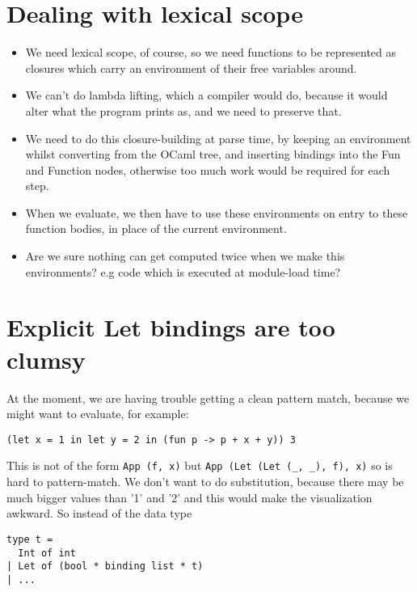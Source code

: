 \documentclass[10pt]{article}
\begin{document}
\section*{Dealing with lexical scope}

\begin{itemize}
\item We need lexical scope, of course, so we need functions to be represented as
closures which carry an environment of their free variables around.

\item We can't do lambda lifting, which a compiler would do, because it
would alter what the program prints as, and we need to preserve that.

\item We need to do this closure-building at parse time, by keeping an environment
whilst converting from the OCaml tree, and inserting bindings into the Fun and
Function nodes, otherwise too much work would be required for each step.

\item When we evaluate, we then have to use these environments on entry to these
function bodies, in place of the current environment.

\item Are we sure nothing can get computed twice when we make this environments? e.g code which is executed at module-load time?

\end{itemize}


\section*{Explicit Let bindings are too clumsy}

At the moment, we are having trouble getting a clean pattern match, because we
might want to evaluate, for example:

\begin{verbatim}
(let x = 1 in let y = 2 in (fun p -> p + x + y)) 3
\end{verbatim}

This is not of the form \verb!App (f, x)! but \verb!App (Let (Let (_, _), f), x)! so is hard
to pattern-match. We don't want to do substitution, because there may be much bigger values than '1' and '2' and this would make the visualization awkward. So instead of the data type

\begin{verbatim}
type t =
  Int of int
| Let of (bool * binding list * t)
| ...
\end{verbatim}
\end{document}

